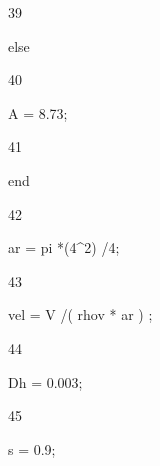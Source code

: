 \documentclass[a4paper,portrait,12pt]{article}
\begin{document}
39





\begin{flushleft}
else
\end{flushleft}





40





\begin{flushleft}
A = 8.73;
\end{flushleft}





41





\begin{flushleft}
end
\end{flushleft}





42





\begin{flushleft}
ar = pi *(4\^{}2) /4;
\end{flushleft}





43





\begin{flushleft}
vel = V /( rhov * ar ) ;
\end{flushleft}





44





\begin{flushleft}
Dh = 0.003;
\end{flushleft}





45





\begin{flushleft}
s = 0.9;
\end{flushleft}
\end{document}
